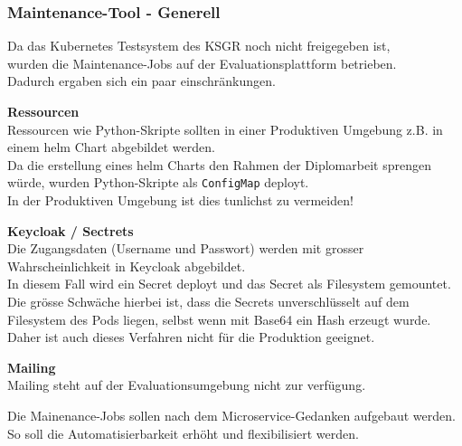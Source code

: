 
\begin{flushleft}
    \subsubsection{Maintenance-Tool - Generell}
    Da das \Gls{Kubernetes} Testsystem des KSGR noch nicht freigegeben ist,\\
    wurden die Maintenance-Jobs auf der Evaluationsplattform betrieben.\\
    Dadurch ergaben sich ein paar einschränkungen.
    \begin{description}
        \item \textbf{Ressourcen}\hfill \\Ressourcen wie Python-Skripte sollten in einer Produktiven Umgebung z.B. in einem \Gls{helm} Chart abgebildet werden.\\Da die erstellung eines \gls{helm} Charts den Rahmen der Diplomarbeit sprengen würde, wurden Python-Skripte als \texttt{ConfigMap} deployt.\\In der Produktiven Umgebung ist dies tunlichst zu vermeiden!
        \item \textbf{\Gls{Keycloak} / Sectrets}\hfill \\Die Zugangsdaten (Username und Passwort) werden mit grosser Wahrscheinlichkeit in \Gls{Keycloak} abgebildet.\\In diesem Fall wird ein Secret deployt und das Secret als Filesystem gemountet.\\Die grösse Schwäche hierbei ist, dass die Secrets unverschlüsselt auf dem Filesystem des Pods liegen, selbst wenn mit Base64 ein Hash erzeugt wurde.\\Daher ist auch dieses Verfahren nicht für die Produktion geeignet.
        \item \textbf{Mailing}\hfill \\Mailing steht auf der Evaluationsumgebung nicht zur verfügung.
    \end{description}
\end{flushleft}
\begin{flushleft}
    Die Mainenance-Jobs sollen nach dem Microservice-Gedanken aufgebaut werden.\\
    So soll die Automatisierbarkeit erhöht und flexibilisiert werden.
\end{flushleft}